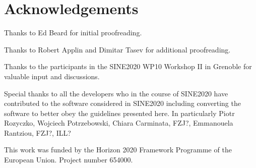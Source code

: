 \documentclass[jnr]{iosart2x}
\begin{document}
\section{Acknowledgements}
\label{Acknowledgements}

Thanks to Ed Beard for initial proofreading.

Thanks to Robert Applin and Dimitar Tasev for additional proofreading.

Thanks to the participants in the SINE2020 WP10 Workshop II in Grenoble for valuable input and discussions.

Special thanks to all the developers who in the course of SINE2020 have contributed to the software considered in SINE2020 including converting the software to better obey the guidelines presented here.
In particularly Piotr Rozyczko, Wojciech Potrzebowski, Chiara Carminata, FZJ?, Emmanouela Rantziou, FZJ?, ILL?

This work was funded by the Horizon 2020 Framework Programme of the European Union.
Project number 654000.



\nocite{*}


\end{document}
